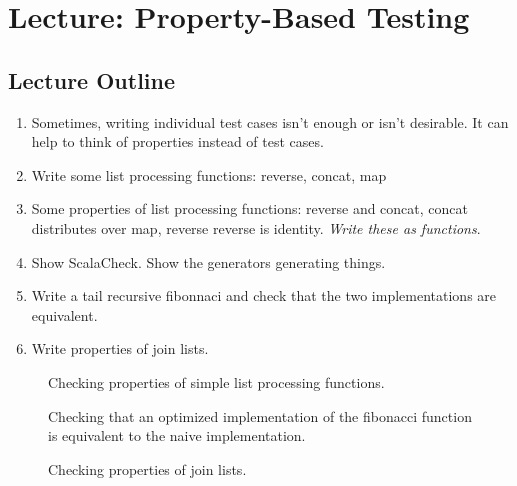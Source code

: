 \chapter{Lecture: Property-Based Testing}
\startlecture

\begin{instructor}

\section*{Lecture Outline}

\begin{enumerate}

\item  Sometimes, writing individual test cases isn't enough or isn't desirable.
It can help to think of properties instead of test cases.

\item Write some list processing functions: reverse, concat, map

\item Some properties of list processing functions: reverse and concat,
  concat distributes over map, reverse reverse is identity. \emph{Write these
    as functions}.

\item Show ScalaCheck. Show the generators generating things.

\item Write a tail recursive fibonnaci and check that the two implementations
are equivalent.

\item Write properties of join lists.

\end{enumerate}

\end{instructor}

\begin{figure}
  \caption{Checking properties of simple list processing functions.}
\end{figure}

\begin{figure}
  \caption{Checking that an optimized implementation of the fibonacci
    function is equivalent to the naive implementation.}
  
\end{figure}

\begin{figure}
  \caption{Checking properties of join lists.}
\end{figure}
